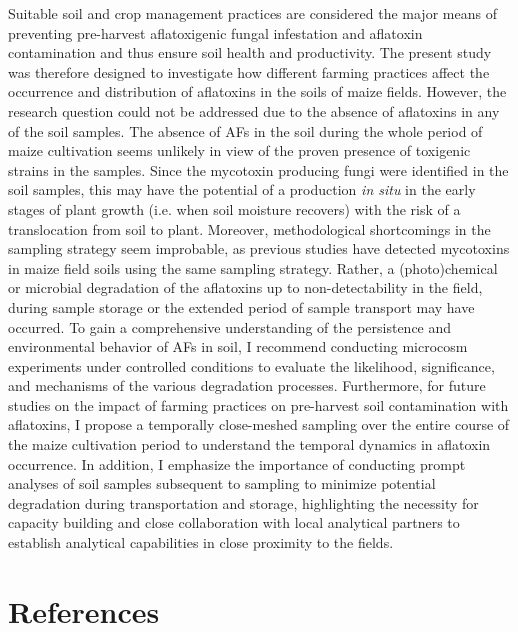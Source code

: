 \begin{refsection}
Suitable soil and crop management practices are considered the major means of preventing pre-harvest aflatoxigenic fungal infestation and aflatoxin contamination and thus ensure soil health and productivity. The present study was therefore designed to investigate how different farming practices affect the occurrence and distribution of aflatoxins in the soils of maize fields. However, the research question could not be addressed due to the absence of aflatoxins in any of the soil samples. The absence of AFs in the soil during the whole period of maize cultivation seems unlikely in view of the proven presence of toxigenic strains in the samples. Since the mycotoxin producing fungi were identified in the soil samples, this may have the potential of a production \textit{in situ} in the early stages of plant growth (i.e. when soil moisture recovers) with the risk of a translocation from soil to plant. Moreover, methodological shortcomings in the sampling strategy seem improbable, as previous studies have detected mycotoxins in maize field soils using the same sampling strategy. Rather, a (photo)chemical or microbial degradation of the aflatoxins up to non-detectability in the field, during sample storage or the extended period of sample transport may have occurred. To gain a comprehensive understanding of the persistence and environmental behavior of AFs in soil, I recommend conducting microcosm experiments under controlled conditions to evaluate the likelihood, significance, and mechanisms of the various degradation processes. Furthermore, for future studies on the impact of farming practices on pre-harvest soil contamination with aflatoxins, I propose a temporally close-meshed sampling over the entire course of the maize cultivation period to understand the temporal dynamics in aflatoxin occurrence. In addition, I emphasize the importance of conducting prompt analyses of soil samples subsequent to sampling to minimize potential degradation during transportation and storage, highlighting the necessity for capacity building and close collaboration with local analytical partners to establish analytical capabilities in close proximity to the fields.

\section{References}

\printbibliography[segment=\therefsegment, heading=none]

\end{refsection}
